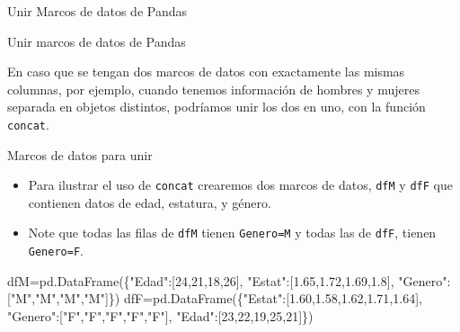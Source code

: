 \documentclass[
  ignorenonframetext,
  aspectratio=169,
  spanish,
]{beamer}
\newenvironment{Shaded}{\begin{snugshade}}{\end{snugshade}}
\newcommand{\DecValTok}[1]{\textcolor[rgb]{0.68,0.00,0.00}{#1}}
\newcommand{\FloatTok}[1]{\textcolor[rgb]{0.68,0.00,0.00}{#1}}
\newcommand{\NormalTok}[1]{\textcolor[rgb]{0.00,0.23,0.31}{#1}}
\newcommand{\OperatorTok}[1]{\textcolor[rgb]{0.37,0.37,0.37}{#1}}
\newcommand{\StringTok}[1]{\textcolor[rgb]{0.13,0.47,0.30}{#1}}
\begin{document}
\begin{frame}[fragile]{Unir Marcos de datos de Pandas}
\begin{block}{Unir marcos de datos de Pandas}
\label{unir-marcos-de-datos-de-pandas-1}

En caso que se tengan dos marcos de datos con exactamente las mismas
columnas, por ejemplo, cuando tenemos información de hombres y mujeres
separada en objetos distintos, podríamos unir los dos en uno, con la
función  \texttt{concat}.
\end{block}

\begin{block}{Marcos de datos para unir}
\label{marcos-de-datos-para-unir}
\begin{itemize}
\item
  Para ilustrar el uso de \texttt{concat} crearemos dos marcos de datos,
  \texttt{dfM} y \texttt{dfF} que contienen datos de edad, estatura, y
  género.
\item
  Note que todas las filas de \texttt{dfM} tienen \texttt{Genero=M} y
  todas las de \texttt{dfF}, tienen \texttt{Genero=F}.
\end{itemize}

\begin{Shaded}
\begin{Highlighting}[]
\NormalTok{dfM}\OperatorTok{=}\NormalTok{pd.DataFrame(\{}\StringTok{"Edad"}\NormalTok{:[}\DecValTok{24}\NormalTok{,}\DecValTok{21}\NormalTok{,}\DecValTok{18}\NormalTok{,}\DecValTok{26}\NormalTok{],}
     \StringTok{"Estat"}\NormalTok{:[}\FloatTok{1.65}\NormalTok{,}\FloatTok{1.72}\NormalTok{,}\FloatTok{1.69}\NormalTok{,}\FloatTok{1.8}\NormalTok{],}
     \StringTok{"Genero"}\NormalTok{:[}\StringTok{"M"}\NormalTok{,}\StringTok{"M"}\NormalTok{,}\StringTok{"M"}\NormalTok{,}\StringTok{"M"}\NormalTok{]\})}
\NormalTok{dfF}\OperatorTok{=}\NormalTok{pd.DataFrame(\{}\StringTok{"Estat"}\NormalTok{:[}\FloatTok{1.60}\NormalTok{,}\FloatTok{1.58}\NormalTok{,}\FloatTok{1.62}\NormalTok{,}\FloatTok{1.71}\NormalTok{,}\FloatTok{1.64}\NormalTok{],}
\StringTok{"Genero"}\NormalTok{:[}\StringTok{"F"}\NormalTok{,}\StringTok{"F"}\NormalTok{,}\StringTok{"F"}\NormalTok{,}\StringTok{"F"}\NormalTok{,}\StringTok{"F"}\NormalTok{],     }
\StringTok{"Edad"}\NormalTok{:[}\DecValTok{23}\NormalTok{,}\DecValTok{22}\NormalTok{,}\DecValTok{19}\NormalTok{,}\DecValTok{25}\NormalTok{,}\DecValTok{21}\NormalTok{]\})}
\end{Highlighting}
\end{Shaded}
\end{block}


\end{frame}
\end{document}
